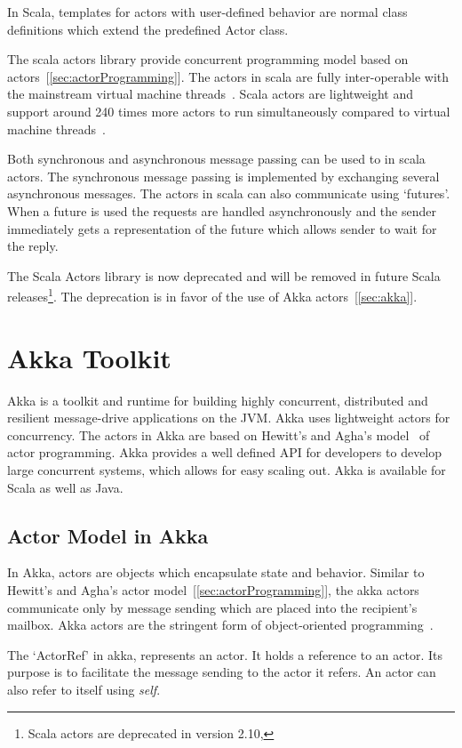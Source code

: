   In Scala, templates for actors with user-defined behavior are normal class definitions which extend the predefined Actor class.

  The scala actors library provide concurrent programming model based on actors~[\autoref{sec:actorProgramming}]. The actors in scala are fully inter-operable with the mainstream virtual machine threads~\cite{Haller}. Scala actors are lightweight and support around 240 times more actors to run simultaneously compared to virtual machine threads~\cite{Haller}.

  Both synchronous and asynchronous message passing can be used to in scala actors. The synchronous message passing is implemented by exchanging several asynchronous messages. The actors in scala can also communicate using ‘futures’. When a future is used the requests are handled asynchronously and the sender immediately gets a representation of the future which allows sender to wait for the reply.~\cite{scalaActors}

  The Scala Actors library is now deprecated and will be removed in future Scala releases\footnote{Scala actors are deprecated in version 2.10, }. The deprecation is in favor of the use of Akka actors~[\autoref{sec:akka}].

\section{Akka Toolkit}
\label{sec:akka}
Akka is a toolkit and runtime for building highly concurrent, distributed and resilient message-drive applications on the JVM. Akka uses lightweight actors for concurrency. The actors in Akka are based on Hewitt's and Agha's model~\cite{agha, hewitt} of actor programming. Akka provides a well defined API for developers to develop large concurrent systems, which allows for easy scaling out.
  Akka is available for Scala as well as Java.

  \subsection{Actor Model in Akka}
  In Akka, actors are objects which encapsulate state and behavior. Similar to Hewitt's and Agha's actor model~[\autoref{sec:actorProgramming}], the akka actors communicate only by message sending which are placed into the recipient’s mailbox. Akka actors are the stringent form of object-oriented programming~\cite{akkaActorSystem}.

  The ‘ActorRef’ in akka, represents an actor. It holds a reference to an actor. Its purpose is to facilitate the message sending to the actor it refers. An actor can also refer to itself using \emph{self}. ~\cite{akkaJavaDoc}

